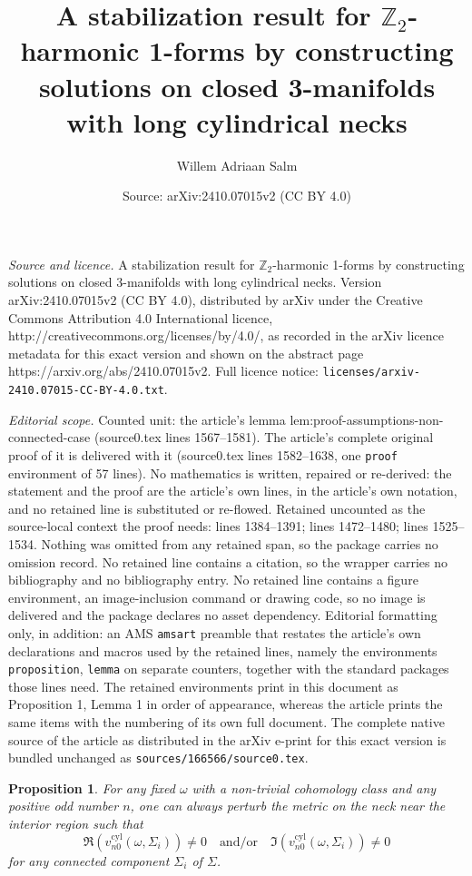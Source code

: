 \documentclass[10pt,a4paper]{amsart}
\title{A stabilization result for $\mathbb{Z}_2$-harmonic 1-forms by constructing solutions on closed 3-manifolds with long cylindrical necks}
\author{Willem Adriaan Salm}
\date{Source: arXiv:2410.07015v2 (CC BY 4.0)}
\newtheorem{proposition}{Proposition}
\begin{document}
\maketitle

\noindent\emph{Source and licence.} A stabilization result for $\mathbb{Z}_2$-harmonic 1-forms by constructing solutions on closed 3-manifolds with long cylindrical necks. Version arXiv:2410.07015v2 (CC BY 4.0), distributed by arXiv under the Creative Commons Attribution 4.0 International licence, http://creativecommons.org/licenses/by/4.0/, as recorded in the arXiv licence metadata for this exact version and shown on the abstract page https://arxiv.org/abs/2410.07015v2. Full licence notice: \texttt{licenses/arxiv-2410.07015-CC-BY-4.0.txt}.\par\smallskip

\noindent\textit{Editorial scope.} Counted unit: the article's lemma lem:proof-assumptions-non-connected-case (source0.tex lines 1567--1581). The article's complete original proof of it is delivered with it (source0.tex lines 1582--1638, one \texttt{proof} environment of 57 lines). No mathematics is written, repaired or re-derived: the statement and the proof are the article's own lines, in the article's own notation, and no retained line is substituted or re-flowed.  Retained uncounted as the source-local context the proof needs: lines 1384--1391; lines 1472--1480; lines 1525--1534.  Nothing was omitted from any retained span, so the package carries no omission record.  No retained line contains a citation, so the wrapper carries no bibliography and no bibliography entry.  No retained line contains a figure environment, an image-inclusion command or drawing code, so no image is delivered and the package declares no asset dependency.  Editorial formatting only, in addition: an AMS \texttt{amsart} preamble that restates the article's own declarations and macros used by the retained lines, namely the environments \texttt{proposition}, \texttt{lemma} on separate counters, together with the standard packages those lines need.  The retained environments print in this document as Proposition 1, Lemma 1 in order of appearance, whereas the article prints the same items with the numbering of its own full document.  The complete native source of the article as distributed in the arXiv e-print for this exact version is bundled unchanged as \texttt{sources/166566/source0.tex}.
\begin{proposition}
	\label{prop:variation-metric-v-cyl}
	For any fixed $\omega$ with a non-trivial cohomology class and any positive odd number $n$, one can always perturb the metric on the neck near the interior region such that 
	$$
	\Re(v^{\mathrm{cyl}}_{n0}(\omega, \Sigma_i)) \not = 0 \quad\text{and/or}\quad \Im(v^{\mathrm{cyl}}_{n0}(\omega, \Sigma_i)) \not = 0
	$$
	for any connected component $\Sigma_i$ of $\Sigma$. 
\end{proposition}
\end{document}
